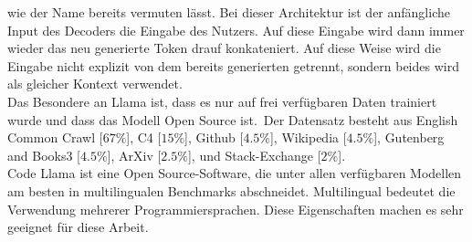 \documentclass[12pt,letterpaper,ngerman]{article}
\begin{document}
wie der Name bereits vermuten lässt. Bei dieser Architektur
ist der anfängliche Input des Decoders die Eingabe des Nutzers.
Auf diese Eingabe wird dann immer wieder das neu generierte Token
drauf konkateniert. Auf diese Weise wird die Eingabe nicht explizit
von dem bereits generierten getrennt, sondern beides wird als 
gleicher Kontext verwendet.\\
Das Besondere an Llama ist, dass es nur auf frei verfügbaren
Daten trainiert wurde und dass das Modell Open Source ist. Der
Datensatz besteht aus English Common Crawl [$67\%$],
C4 [$15\%$],  Github [$4.5\%$],
Wikipedia [$4.5\%$], Gutenberg and Books3 [$4.5\%$], 
ArXiv [$2.5\%$], und Stack-Exchange [$2\%$].\\
Code Llama ist eine Open Source-Software, die unter allen 
verfügbaren Modellen am besten in multilingualen Benchmarks 
abschneidet. Multilingual bedeutet die Verwendung mehrerer 
Programmiersprachen. Diese Eigenschaften machen es sehr geeignet
für diese Arbeit.
\end{document}
